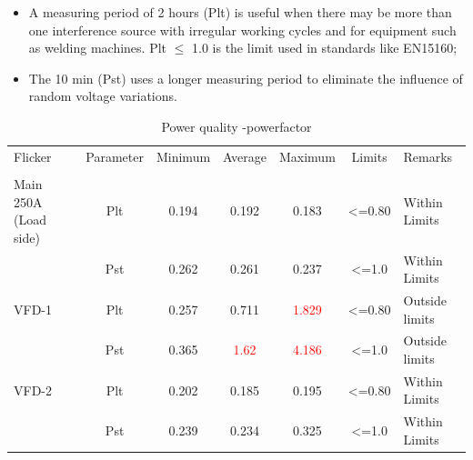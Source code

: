\begin{itemize}
	\item A measuring period of 2 hours (Plt) is useful when there may be more than one interference source with irregular working cycles and for equipment such as welding machines. Plt $\leq$ 1.0 is the limit used in standards like EN15160;
\item The 10 min (Pst) uses a longer measuring period to eliminate the influence of random voltage variations.

	
\end{itemize}
%
\begin{table}[!htb]
	\caption{Power quality -powerfactor}
	\label{tbl_ch04_elecaudit_powerquality_flicker}
	{\scriptsize
	
	\begin{tabular}{l|l|l|l|l|l|l}
\hline
Flicker & \multicolumn{1}{c|}{Parameter} & \multicolumn{1}{c|}{Minimum} & \multicolumn{1}{c|}{Average} & \multicolumn{1}{c|}{Maximum} & \multicolumn{1}{c|}{Limits} & Remarks \\ 
 & \multicolumn{1}{c|}{} & \multicolumn{1}{c|}{} & \multicolumn{1}{c|}{} & \multicolumn{1}{c|}{} & \multicolumn{1}{c|}{} &  \\ 
\hline
Main 250A (Load side) & \multicolumn{1}{c|}{Plt} & \multicolumn{1}{c|}{0.194} & \multicolumn{1}{c|}{0.192} & \multicolumn{1}{c|}{0.183} & \multicolumn{1}{c|}{<=0.80} & Within  Limits \\ 
 & \multicolumn{1}{c|}{Pst} & \multicolumn{1}{c|}{0.262} & \multicolumn{1}{c|}{0.261} & \multicolumn{1}{c|}{0.237} & \multicolumn{1}{c|}{<=1.0} & Within  Limits \\ 
\hline
VFD-1 & \multicolumn{1}{c|}{Plt} & \multicolumn{1}{c|}{0.257} & \multicolumn{1}{c|}{0.711} & \multicolumn{1}{c|}{\textcolor{red}{1.829}} & \multicolumn{1}{c|}{<=0.80} & Outside limits \\ 
 & \multicolumn{1}{c|}{Pst} & \multicolumn{1}{c|}{0.365} & \multicolumn{1}{c|}{\textcolor{red}{1.62}} & \multicolumn{1}{c|}{\textcolor{red}{4.186}} & \multicolumn{1}{c|}{<=1.0} & Outside limits \\ 
\hline
VFD-2 & \multicolumn{1}{c|}{Plt} & \multicolumn{1}{c|}{0.202} & \multicolumn{1}{c|}{0.185} & \multicolumn{1}{c|}{0.195} & \multicolumn{1}{c|}{<=0.80} & Within  Limits \\ 
 & \multicolumn{1}{c|}{Pst} & \multicolumn{1}{c|}{0.239} & \multicolumn{1}{c|}{0.234} & \multicolumn{1}{c|}{0.325} & \multicolumn{1}{c|}{<=1.0} & Within  Limits \\ 
\hline
\end{tabular}
	
	}%
\end{table}
%
